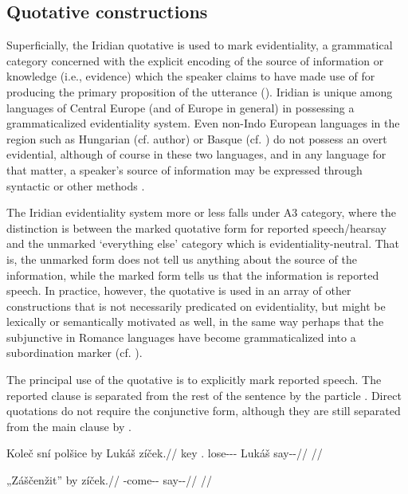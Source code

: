 \subsection{Quotative constructions}\label{sec:reported-speech}

Superficially, the Iridian quotative is used to mark {\sc evidentiality}, a
grammatical category concerned with the explicit encoding of the source of
information or knowledge (i.e., evidence) which the speaker claims to have made
use of for producing the primary proposition of the utterance
(\cite[1-2]{diewald2010}). Iridian is unique among languages of Central Europe
(and of Europe in general) in possessing a grammaticalized evidentiality system.
Even non-Indo European languages in the region such as Hungarian (cf. author) or
Basque (cf. \cite{alcazar2010}) do not possess an overt evidential, although of
course in these two languages, and in any language for that matter, a speaker's
source of information may be expressed through syntactic or other methods .

The Iridian evidentiality system more or less falls under
 A3 category, where the distinction is between the
marked quotative form for reported speech/hearsay and the unmarked `everything
else' category which is evidentiality-neutral. That is, the unmarked form does
not tell us anything about the source of the information, while the marked form
tells us that the information is reported speech. In practice, however, the
quotative is used in an array of other constructions that is not necessarily
predicated on evidentiality, but might be lexically or semantically motivated as
well, in the same way perhaps that the subjunctive in Romance languages have
become grammaticalized into a subordination marker (cf. \cite{poplacketal}).

The principal use of the quotative is to explicitly mark reported speech. The
reported clause is separated from the rest of the sentence by the particle
. Direct quotations do not require the conjunctive form, although they are
still separated from the main clause by .

\pex
  \begingl
    \gla Koleč sní polšice by Lukáš zíček.//
    \glb key \Refl{}.\Acc{} lose-\Av{}-\Pf{}-\Cnj{} \Quot{} Lukáš say-\Av{}-\Pf{}//
    \glft {}//
  \endgl
\xe

\pex
  \begingl
    \gla „Záščenžit” by zíček.//
    \glb \First{}\Sg{} \Neg{}-come-\Av{}-\SupP{} \Quot{} say-\Av{}-\Pf{}//
    \glft {}//
  \endgl
\xe

